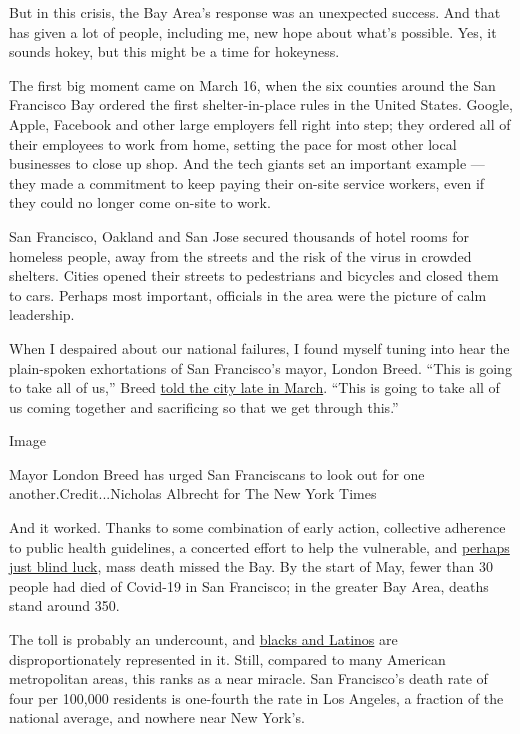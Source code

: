 But in this crisis, the Bay Area's response was an unexpected success.
And that has given a lot of people, including me, new hope about what's
possible. Yes, it sounds hokey, but this might be a time for hokeyness.

The first big moment came on March 16, when the six counties around the
San Francisco Bay ordered the first shelter-in-place rules in the United
States. Google, Apple, Facebook and other large employers fell right
into step; they ordered all of their employees to work from home,
setting the pace for most other local businesses to close up shop. And
the tech giants set an important example --- they made a commitment to
keep paying their on-site service workers, even if they could no longer
come on-site to work.

San Francisco, Oakland and San Jose secured thousands of hotel rooms for
homeless people, away from the streets and the risk of the virus in
crowded shelters. Cities opened their streets to pedestrians and
bicycles and closed them to cars. Perhaps most important, officials in
the area were the picture of calm leadership.

When I despaired about our national failures, I found myself tuning into
hear the plain-spoken exhortations of San Francisco's mayor, London
Breed. ``This is going to take all of us,'' Breed
\href{https://www.youtube.com/watch?v=YkkcLEJ-nLY}{told the city late in
March}. ``This is going to take all of us coming together and
sacrificing so that we get through this.''

Image

Mayor London Breed has urged San Franciscans to look out for one
another.Credit...Nicholas Albrecht for The New York Times

And it worked. Thanks to some combination of early action, collective
adherence to public health guidelines, a concerted effort to help the
vulnerable, and
\href{https://www.nbcbayarea.com/news/local/difference-between-covid-19-cases-in-ca-vs-ny-is-likely-sheer-luck-experts/2269934/}{perhaps
just blind luck}, mass death missed the Bay. By the start of May, fewer
than 30 people had died of Covid-19 in San Francisco; in the greater Bay
Area, deaths stand around 350.

The toll is probably an undercount, and
\href{https://www.nytimes3xbfgragh.onion/2020/04/28/us/coronavirus-california-black-latinos.html}{blacks
and Latinos} are disproportionately represented in it. Still, compared
to many American metropolitan areas, this ranks as a near miracle. San
Francisco's death rate of four per 100,000 residents is one-fourth the
rate in Los Angeles, a fraction of the national average, and nowhere
near New York's.

